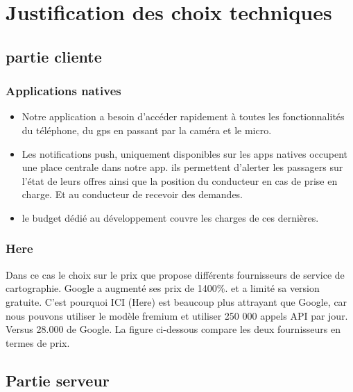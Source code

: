 \section{Justification des choix techniques} %
\label{sec:justification_du_choix_technique}
\subsection{partie cliente} %
\label{sub:partie_cliente}
\subsubsection{Applications natives} %
\label{ssub:application_native}
\begin{itemize}
	\item Notre application a besoin d’accéder rapidement à toutes les fonctionnalités du téléphone, du gps en passant par la caméra et le micro.
	\item Les notifications push, uniquement disponibles sur les apps natives occupent une place centrale dans notre app. ils permettent d’alerter les passagers sur l'état de leurs offres ainsi que la position du conducteur en cas de prise en charge. Et au conducteur de recevoir des demandes.
	\item le budget dédié au développement couvre les charges de ces dernières.
\end{itemize}

\subsubsection{Here} %
\label{ssub:here}
Dans ce cas le choix sur le prix que propose différents fournisseurs de service de cartographie.\newline
Google a augmenté ses prix de 1400\%. et a limité sa version gratuite. C'est pourquoi ICI (Here) est beaucoup plus attrayant que Google, car nous pouvons utiliser le modèle fremium et utiliser 250 000 appels API par jour. Versus 28.000 de Google.\newline
La figure ci-dessous compare les deux fournisseurs en termes de prix.\cite{heremaps}

\subsection{Partie serveur} %
\label{sub:partie_serveur}

